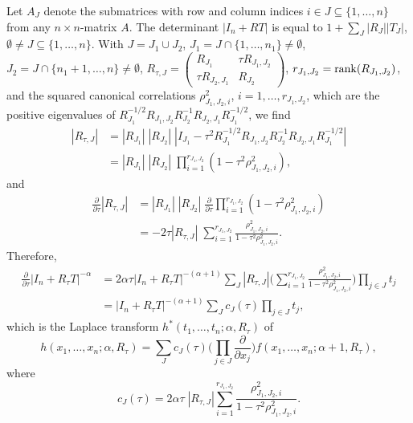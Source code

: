 \documentclass[12pt,twoside]{article}
\numberwithin{equation}{section}
\theoremstyle{plain}
\begin{document}
Let $A_J$ denote the submatrices with row and column indices $i\in J \subseteq \{1,\ldots,n\}$ from any $n \times n$-matrix $A$. The determinant $|I_n+RT|$ is equal to $1 + \sum_J |R_J| |T_J|$, $\emptyset \neq J \subseteq \{1,\ldots,n\}$.  With $J = J_1 \cup J_2$, $J_1 = J \cap \{1,\ldots,n_1\} \neq \emptyset$, $J_2 = J \cap \{n_1+1,\ldots,n\} \neq \emptyset$, $R_{\tau,J} = \begin{pmatrix} R_{J_1} & \tau R_{J_1,J_2} \\ \tau R_{J_2,J_1} & R_{J_2}\end{pmatrix}$, $r_{J_1,J_2} = {\rm{rank}}(R_{J_1,J_2})$, and the squared canonical correlations $\rho_{J_1,J_2,i}^2$, $i=1,\ldots,r_{J_1,J_2}$, which are the positive eigenvalues of $R_{J_1}^{-1/2} R_{J_1,J_2} R_{J_2}^{-1} R_{J_2,J_1} R_{J_1}^{-1/2}$, we find 
\begin{align*}
|R_{\tau,J}| &= |R_{J_1}| \; |R_{J_2}| \; |I_{J_1} - \tau^2 R_{J_1}^{-1/2} R_{J_1,J_2} R_{J_2}^{-1} R_{J_2,J_1} R_{J_1}^{-1/2}| \\
&= |R_{J_1}| \; |R_{J_2}| \; \prod_{i=1}^{r_{J_1,J_2}}(1-\tau^2\rho_{J_1,J_2,i}^2),
\end{align*}
and 
\begin{align*}
\frac{\partial}{\partial\tau} |R_{\tau,J}| 
&= |R_{J_1}| \; |R_{J_2}| \; \frac{\partial}{\partial\tau} \prod_{i=1}^{r_{J_1,J_2}}(1-\tau^2\rho_{J_1,J_2,i}^2) \\
&= -2\tau |R_{\tau,J}| \; \sum_{i=1}^{r_{J_1,J_2}} \frac{\rho_{J_1,J_2,i}^2}{1-\tau^2\rho_{J_1,J_2,i}^2}.
\end{align*}
Therefore, 
\begin{align}
\label{2.4}
\frac{\partial}{\partial\tau} |I_n+R_\tau T|^{-\alpha} &= 2\alpha\tau |I_n+R_\tau T|^{-(\alpha+1)} \sum_J |R_{\tau,J}| \Big(\sum_{i=1}^{r_{J_1,J_2}} \frac{\rho_{J_1,J_2,i}^2}{1-\tau^2\rho_{J_1,J_2,i}^2}\Big) \prod_{j \in J} t_j \nonumber \\
&= |I_n+R_\tau T|^{-(\alpha+1)} \sum_J c_J(\tau) \prod_{j \in J} t_j,
\end{align}
which is the Laplace transform $h^*(t_1,\ldots,t_n;\alpha,R_\tau)$ of 
\begin{equation}
\label{2.5}
h(x_1,\ldots,x_n;\alpha,R_\tau) = \sum_J c_J(\tau) \Big(\prod_{j \in J} \frac{\partial}{\partial x_j}\Big) f(x_1,\ldots,x_n;\alpha+1,R_\tau),
\end{equation}
where 
$$
c_J(\tau) = 2\alpha\tau \; |R_{\tau,J}| \sum_{i=1}^{r_{J_1,J_2}} \frac{\rho_{J_1,J_2,i}^2}{1-\tau^2\rho_{J_1,J_2,i}^2}.
$$
\end{document}
